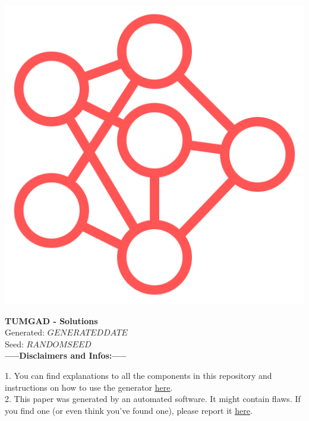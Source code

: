 \documentclass[12pt]{article}
\begin{document}
    \begin{center}
        \includegraphics[scale=0.25]{faviconRed.png} %
        \vspace{15px}

        {\selectfont
            \textbf{\LARGE{TUMGAD - Solutions}}\\
            Generated: $GENERATEDDATE$\\
            Seed: $RANDOMSEED$\\
        }
        \vspace{20px}
        \textbf{\LARGE{-----Disclaimers and Infos:-----}}
        \\[0.2in]
    \end{center}
    1. You can find explanations to all the components in this repository and instructions on how to use the generator \href{https://sebastianoner.github.io/TUMGAD/src/routes}{\underline{here}}.
    \\[0.2in]
    2. This paper was generated by an automated software.
    It might contain flaws.
    If you find one (or even think you've found one), please report it \href{https://github.com/SebastianOner/TUMGAD/issues/new?assignees=&labels=&template=bug_report.md&title=}{\underline{here}}.
    \\[0.2in]
\end{document}
